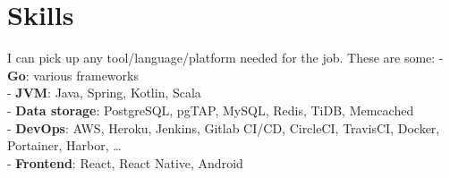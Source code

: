 \section*{Skills}
{ %
  I can pick up any tool/language/platform needed for the job.
  These are some:
  \break
  - \textbf{Go}: various frameworks\\
  - \textbf{JVM}: Java, Spring, Kotlin, Scala \\
  - \textbf{Data storage}: PostgreSQL, pgTAP, MySQL, Redis, TiDB, Memcached \\
  - \textbf{DevOps}: AWS, Heroku, Jenkins, Gitlab CI/CD, CircleCI, TravisCI,
  Docker, Portainer, Harbor, \ldots\\
  - \textbf{Frontend}: React, React Native, Android
}
